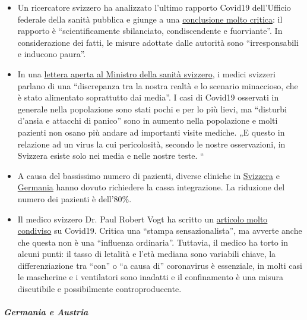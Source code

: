 \begin{itemize}
\item
  Un ricercatore svizzero ha analizzato l'ultimo rapporto Covid19
  dell'Ufficio federale della sanità pubblica e giunge a una
  \href{https://covid-19-fakten.blogspot.com/2020/04/die-analyse-des-aktuellen.html}{conclusione
  molto critica}: il rapporto è ``scientificamente sbilanciato,
  condiscendente e fuorviante''. In considerazione dei fatti, le misure
  adottate dalle autorità sono ``irresponsabili e inducono paura''.
\item
  In una \href{https://www.rontalpraxis.ch/aktuelles}{lettera aperta al
  Ministro della sanità svizzero}, i medici svizzeri parlano di una
  ``discrepanza tra la nostra realtà e lo scenario minaccioso, che è
  stato alimentato soprattutto dai media''. I casi di Covid19 osservati
  in generale nella popolazione sono stati pochi e per lo più lievi, ma
  ``disturbi d'ansia e attacchi di panico'' sono in aumento nella
  popolazione e molti pazienti non osano più andare ad importanti visite
  mediche. „E questo in relazione ad un virus la cui pericolosità,
  secondo le nostre osservazioni, in Svizzera esiste solo nei media e
  nelle nostre teste. ``
\item
  A causa del bassissimo numero di pazienti, diverse cliniche in
  \href{https://www.20min.ch/schweiz/news/story/Spitaeler-28949526}{Svizzera}
  e
  \href{https://www.spiegel.de/wirtschaft/unternehmen/trotz-corona-pandemie-warum-kliniken-jetzt-kurzarbeit-anmelden-a-3dc61bc9-fb12-4298-8022-bb4c2be39d7d}{Germania}
  hanno dovuto richiedere la cassa integrazione. La riduzione del numero
  dei pazienti è dell'80\%.
\item
  Il medico svizzero Dr. Paul Robert Vogt ha scritto un
  \href{https://www.mittellaendische.ch/2020/04/07/covid-19-eine-zwischenbilanz-oder-eine-analyse-der-moral-der-medizinischen-fakten-sowie-der-aktuellen-und-zuk\%C3\%BCnftigen-politischen-entscheidungen/}{articolo
  molto condiviso} su Covid19. Critica una ``stampa sensazionalista'',
  ma avverte anche che questa non è una ``influenza ordinaria''.
  Tuttavia, il medico ha torto in alcuni punti: il tasso di letalità e
  l'età mediana sono variabili chiave, la differenziazione tra ``con'' o
  ``a causa di'' coronavirus è essenziale, in molti casi le mascherine e
  i ventilatori sono inadatti e il confinamento è una misura discutibile
  e possibilmente controproducente.
\end{itemize}

\hypertarget{germania-e-austria-1}{%
\subparagraph{\texorpdfstring{\textbf{Germania e
Austria}}{Germania e Austria}}\label{germania-e-austria-1}}

